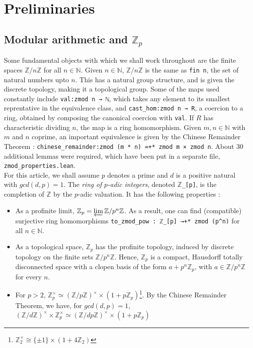 \documentclass[a4paper,UKenglish,cleveref, autoref, thm-restate]{lipics-v2021}
\newcommand{\lean}[1]{\texttt{#1}\xspace} %
\begin{document}
\section{Preliminaries}
\subsection{Modular arithmetic and $\mathbb{Z}_p$}
Some fundamental objects with which we shall work throughout are the finite spaces $\mathbb{Z}/n \mathbb{Z}$ for all $n \in \mathbb{N}$. Given $n \in \mathbb{N}$, 
$\mathbb{Z}/n \mathbb{Z}$ is the same as \lean{fin n}, the set of natural numbers upto $n$. This has a natural group structure, and is given the discrete topology, 
making it a topological group. Some of the maps used constantly include \lean{val:zmod n → ℕ}, which takes any element to its smallest reprentative in the equivalence class, 
and \lean{cast\_hom:zmod n → R}, a coercion to a ring, obtained by composing the canonical coercion with \lean{val}. If $R$ has characteristic 
dividing $n$, the map is a ring homomorphism. Given $m, n \in \mathbb{N}$ with $m$ and $n$ coprime, an important equivalence is given by the Chinese Remainder Theorem : 
\lean{chinese\_remainder:zmod (m * n) ≃+* zmod m × zmod n}. About 30 additional lemmas were required, which have been put in a separate file, \lean{zmod\_properties.lean}. \\

For this article, we shall assume $p$ denotes a prime and $d$ is a positive natural with 
$gcd (d, p) = 1$. The \textit{ring of $p$-adic integers}, denoted \lean{$\mathbb{Z}$\_[p]}, is the completion of $\mathbb{Z}$ by the $p$-adic
valuation. It has the following properties :
\begin{itemize}
  \item As a profinite limit, $\mathbb{Z}_p = \varprojlim \mathbb{Z} / p^n \mathbb{Z}$. As a result,
  one can find (compatible) surjective ring homomorphisms \lean{to\_zmod\_pow : ℤ\_[p] →+* zmod (p\textasciicircum n)} for all $n \in \mathbb{N}$.
  \item As a topological space, $\mathbb{Z}_p$ has the profinite topology, induced by discrete topology
  on the finite sets $\mathbb{Z} / p^n \mathbb{Z}$. Hence, $\mathbb{Z}_p$ is a compact, Hausdorff totally disconnected space
  with a clopen basis of the form $a + p^n \mathbb{Z}_p$, with $a \in \mathbb{Z} / p^n \mathbb{Z}$ for
  every $n$.
  \item For $p > 2$, $\mathbb{Z}_p^{\times} ≃ (\mathbb{Z}/p \mathbb{Z})^{\times} \times (1 + p \mathbb{Z}_p)$\footnote{$\mathbb{Z}_2^{\times} \cong \{ \pm 1 \} \times (1 + 4 \mathbb{Z}_2)$}.
  By the Chinese Remainder Theorem, we have, for $gcd(d, p) = 1$,
  $(\mathbb{Z}/d\mathbb{Z})^{\times} \times \mathbb{Z}_p^{\times} ≃
  (\mathbb{Z}/dp \mathbb{Z})^{\times} \times (1 + p \mathbb{Z}_p)$
\end{itemize}
\end{document}
